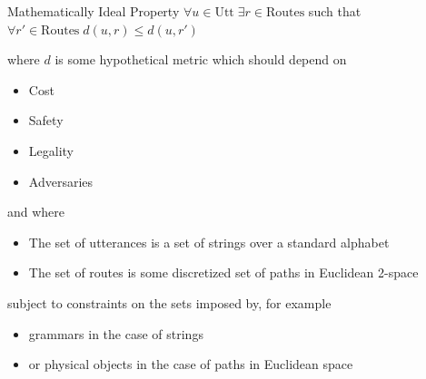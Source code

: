 \documentclass{beamer}
\begin{document}
\begin{frame}
\begin{block}{Mathematically Ideal Property}
  $\forall u \in \text{Utt}\; \exists r \in \text{Routes}$
  such that $\forall r' \in \text{Routes}\; d(u,r) \leq d(u,r')$
\end{block}
\pause
\begin{exampleblock}{}
where $d$ is some hypothetical metric which should depend on
\begin{itemize}
\item Cost
\item Safety
\item Legality
\item Adversaries
\end{itemize}
\end{exampleblock}

\pause
\begin{exampleblock}{}
and where
\begin{itemize}
\item The set of utterances is a set of strings over a standard alphabet
\item The set of routes is some discretized set of paths in Euclidean 2-space
\end{itemize}
subject to constraints on the sets imposed by, for example
\begin{itemize}
\item grammars in the case of strings
\item or physical objects in the case of paths in Euclidean space
\end{itemize}
\end{exampleblock}






\end{frame}
\end{document}
